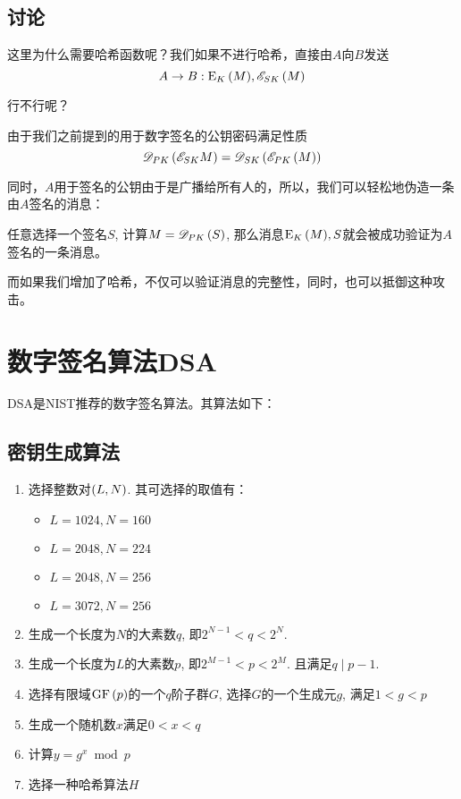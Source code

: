 \subsection{讨论}
这里为什么需要哈希函数呢？我们如果不进行哈希，直接由$A$向$B$发送
\[A\to B:{\mathrm{E}_{K}\left({M}\right)},\mathscr{E}_{SK}\left( {M}\right)\]

行不行呢？\par
由于我们之前提到的用于数字签名的公钥密码满足性质
\[\mathscr{D}_{PK}\left( {\mathscr{E}_{SK}{M}}\right)=\mathscr{D}_{SK}\left( {\mathscr{E}_{PK}\left( {M}\right)}\right)\]

同时，$A$用于签名的公钥由于是广播给所有人的，所以，我们可以轻松地伪造一条由$A$签名的消息：\par
任意选择一个签名$S$, 计算$M=\mathscr{D}_{PK}\left( {S}\right)$, 那么消息${\mathrm{E}_{K}\left({M}\right)}, S$就会被成功验证为$A$签名的一条消息。\par
而如果我们增加了哈希，不仅可以验证消息的完整性，同时，也可以抵御这种攻击。
\section{数字签名算法DSA}
DSA是NIST推荐的数字签名算法。其算法如下：
\subsection{密钥生成算法}
\begin{enumerate}
    \item 选择整数对$\left( {L, N}\right)$. 其可选择的取值有：
    \begin{itemize}
        \item $L=1024, N=160$
        \item $L=2048, N=224$
        \item $L=2048, N=256$
        \item $L=3072, N=256$
    \end{itemize}

    \item 生成一个长度为$N$的大素数$q$, 即$2^{N-1} < q < 2^N$.
    \item 生成一个长度为$L$的大素数$p$, 即$2^{M-1} < p < 2^M$. 且满足$q\mid p - 1$.
    \item 选择有限域$\mathrm{GF}\left( {p}\right)$的一个$q$阶子群$G$, 选择$G$的一个生成元$g$, 满足$1<g<p$
    \item 生成一个随机数$x$满足$0<x<q$
    \item 计算$y=g^x\bmod{p}$
    \item 选择一种哈希算法$H$
\end{enumerate}

